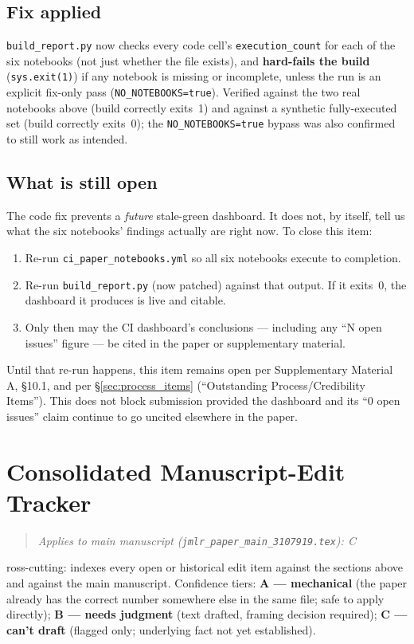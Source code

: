 \documentclass[11pt]{article}
\newenvironment{appliesto}[1]
  {\begin{quote}\small\itshape\noindent Applies to main manuscript
    (\texttt{jmlr\_paper\_main\_3107919.tex}): #1\end{quote}}
  {}
\begin{document}
\subsection*{Fix applied}
\texttt{build\_report.py} now checks every code cell's
\texttt{execution\_count} for each of the six notebooks (not just
whether the file exists), and \textbf{hard-fails the build}
(\texttt{sys.exit(1)}) if any notebook is missing or incomplete,
unless the run is an explicit fix-only pass (\texttt{NO\_NOTEBOOKS=true}).
Verified against the two real notebooks above (build correctly exits~1)
and against a synthetic fully-executed set (build correctly exits~0);
the \texttt{NO\_NOTEBOOKS=true} bypass was also confirmed to still work
as intended.

\subsection*{What is still open}
The code fix prevents a \emph{future} stale-green dashboard. It does not,
by itself, tell us what the six notebooks' findings actually are right now.
To close this item:
\begin{enumerate}
  \item Re-run \texttt{ci\_paper\_notebooks.yml} so all six notebooks
    execute to completion.
  \item Re-run \texttt{build\_report.py} (now patched) against that output.
    If it exits~0, the dashboard it produces is live and citable.
  \item Only then may the CI dashboard's conclusions --- including any
    ``N open issues'' figure --- be cited in the paper or supplementary
    material.
\end{enumerate}

\noindent Until that re-run happens, this item remains open per
Supplementary Material A, \S10.1, and per \S\ref{sec:process_items}
(``Outstanding Process/Credibility Items''). This does not block
submission provided the dashboard and its ``0 open issues'' claim
continue to go uncited elsewhere in the paper.

\clearpage
\section{Consolidated Manuscript-Edit Tracker}
\label{supp:tracker}

\begin{appliesto}
Cross-cutting: indexes every open or historical edit item against the
sections above and against the main manuscript. Confidence tiers: \textbf{A
--- mechanical} (the paper already has the correct number somewhere else
in the same file; safe to apply directly); \textbf{B --- needs judgment}
(text drafted, framing decision required); \textbf{C --- can't draft}
(flagged only; underlying fact not yet established).
\end{appliesto}
\end{document}
